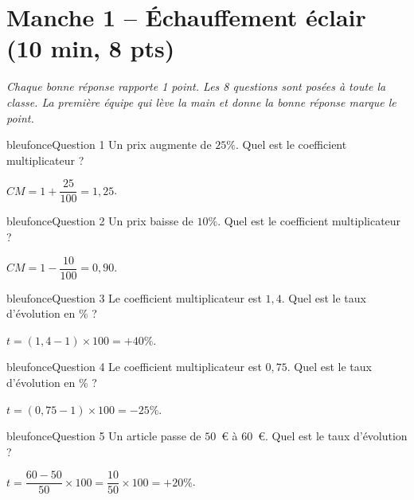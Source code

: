 \documentclass[12pt,a4paper]{article}
\begin{document}
\newpage

\section*{Manche 1 -- Échauffement éclair (10 min, 8 pts)}

\textit{Chaque bonne réponse rapporte 1 point. Les 8 questions sont posées à toute la classe. La première équipe qui lève la main et donne la bonne réponse marque le point.}

\vspace{0.3cm}

\begin{carte}{bleufonce}{Question 1}
Un prix augmente de \(25\%\). Quel est le coefficient multiplicateur ?
\end{carte}
\begin{corrige}
\(CM = 1 + \dfrac{25}{100} = 1{,}25\).
\end{corrige}

\begin{carte}{bleufonce}{Question 2}
Un prix baisse de \(10\%\). Quel est le coefficient multiplicateur ?
\end{carte}
\begin{corrige}
\(CM = 1 - \dfrac{10}{100} = 0{,}90\).
\end{corrige}

\begin{carte}{bleufonce}{Question 3}
Le coefficient multiplicateur est \(1{,}4\). Quel est le taux d'évolution en \% ?
\end{carte}
\begin{corrige}
\(t = (1{,}4 - 1) \times 100 = +40\%\).
\end{corrige}

\begin{carte}{bleufonce}{Question 4}
Le coefficient multiplicateur est \(0{,}75\). Quel est le taux d'évolution en \% ?
\end{carte}
\begin{corrige}
\(t = (0{,}75 - 1) \times 100 = -25\%\).
\end{corrige}

\begin{carte}{bleufonce}{Question 5}
Un article passe de \(50\)~\euro{} à \(60\)~\euro{}. Quel est le taux d'évolution ?
\end{carte}
\begin{corrige}
\(t = \dfrac{60-50}{50} \times 100 = \dfrac{10}{50} \times 100 = +20\%\).
\end{corrige}
\end{document}
